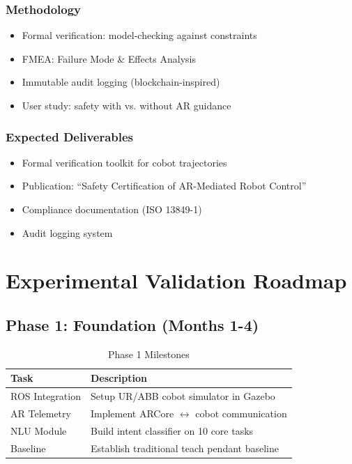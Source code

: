 \documentclass[12pt,a4paper,oneside]{book}
\begin{document}
\subsection{Methodology}
\begin{itemize}
    \item Formal verification: model-checking against constraints
    \item FMEA: Failure Mode \& Effects Analysis
    \item Immutable audit logging (blockchain-inspired)
    \item User study: safety with vs. without AR guidance
\end{itemize}

\subsection{Expected Deliverables}
\begin{tcolorbox}[colback=lightgreen, colframe=darkgreen]
\begin{itemize}
    \item Formal verification toolkit for cobot trajectories
    \item Publication: ``Safety Certification of AR-Mediated Robot Control''
    \item Compliance documentation (ISO 13849-1)
    \item Audit logging system
\end{itemize}
\end{tcolorbox}

\newpage

\chapter{Experimental Validation Roadmap}

\section{Phase 1: Foundation (Months 1-4)}

\begin{table}[H]
\centering
\begin{tabular}{|l|p{7cm}|}
\hline
\textbf{Task} & \textbf{Description} \\
\hline
ROS Integration & Setup UR/ABB cobot simulator in Gazebo \\
AR Telemetry & Implement ARCore $\leftrightarrow$ cobot communication \\
NLU Module & Build intent classifier on 10 core tasks \\
Baseline & Establish traditional teach pendant baseline \\
\hline
\end{tabular}
\caption{Phase 1 Milestones}
\end{table}
\end{document}
